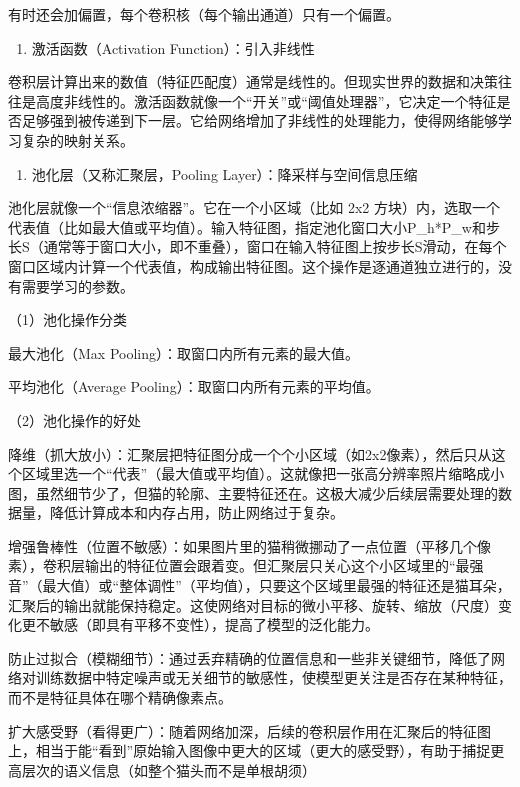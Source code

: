 有时还会加偏置，每个卷积核（每个输出通道）只有一个偏置。

\begin{enumerate}
\def\labelenumi{\arabic{enumi}.}
\setcounter{enumi}{1}
\tightlist
\item
  激活函数（Activation Function）：引入非线性
\end{enumerate}

卷积层计算出来的数值（特征匹配度）通常是线性的。但现实世界的数据和决策往往是高度非线性的。激活函数就像一个``开关''或``阈值处理器''，它决定一个特征是否足够强到被传递到下一层。它给网络增加了非线性的处理能力，使得网络能够学习复杂的映射关系。

\begin{enumerate}
\def\labelenumi{\arabic{enumi}.}
\setcounter{enumi}{2}
\tightlist
\item
  池化层（又称汇聚层，Pooling Layer）：降采样与空间信息压缩
\end{enumerate}

池化层就像一个``信息浓缩器''。它在一个小区域（比如 2x2 方块）内，选取一个代表值（比如最大值或平均值）。输入特征图，指定池化窗口大小P\_h*P\_w和步长S（通常等于窗口大小，即不重叠），窗口在输入特征图上按步长S滑动，在每个窗口区域内计算一个代表值，构成输出特征图。这个操作是逐通道独立进行的，没有需要学习的参数。

（1）池化操作分类

最大池化（Max Pooling）：取窗口内所有元素的最大值。

平均池化（Average Pooling）：取窗口内所有元素的平均值。

（2）池化操作的好处

降维（抓大放小）：汇聚层把特征图分成一个个小区域（如2x2像素），然后只从这个区域里选一个``代表''（最大值或平均值）。这就像把一张高分辨率照片缩略成小图，虽然细节少了，但猫的轮廓、主要特征还在。这极大减少后续层需要处理的数据量，降低计算成本和内存占用，防止网络过于复杂。

增强鲁棒性（位置不敏感）：如果图片里的猫稍微挪动了一点位置（平移几个像素），卷积层输出的特征位置会跟着变。但汇聚层只关心这个小区域里的``最强音''（最大值）或``整体调性''（平均值），只要这个区域里最强的特征还是猫耳朵，汇聚后的输出就能保持稳定。这使网络对目标的微小平移、旋转、缩放（尺度）变化更不敏感（即具有平移不变性），提高了模型的泛化能力。

防止过拟合（模糊细节）：通过丢弃精确的位置信息和一些非关键细节，降低了网络对训练数据中特定噪声或无关细节的敏感性，使模型更关注是否存在某种特征，而不是特征具体在哪个精确像素点。

扩大感受野（看得更广）：随着网络加深，后续的卷积层作用在汇聚后的特征图上，相当于能``看到''原始输入图像中更大的区域（更大的感受野），有助于捕捉更高层次的语义信息（如整个猫头而不是单根胡须）

